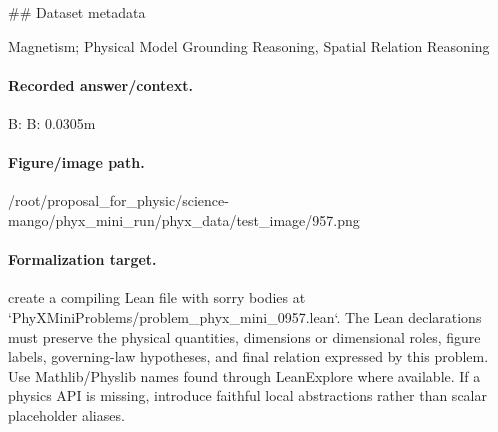 \#\# Dataset metadata

Magnetism; Physical Model Grounding Reasoning, Spatial Relation Reasoning

\paragraph{Recorded answer/context.}
B: B: 0.0305m

\paragraph{Figure/image path.}
/root/proposal\_for\_physic/science-mango/phyx\_mini\_run/phyx\_data/test\_image/957.png

\paragraph{Formalization target.}
create a compiling Lean file with sorry bodies at `PhyXMiniProblems/problem\_phyx\_mini\_0957.lean`. The Lean declarations must preserve the physical quantities, dimensions or dimensional roles, figure labels, governing-law hypotheses, and final relation expressed by this problem.
Use Mathlib/Physlib names found through LeanExplore where available. If a physics API is missing, introduce faithful local abstractions rather than scalar placeholder aliases.

